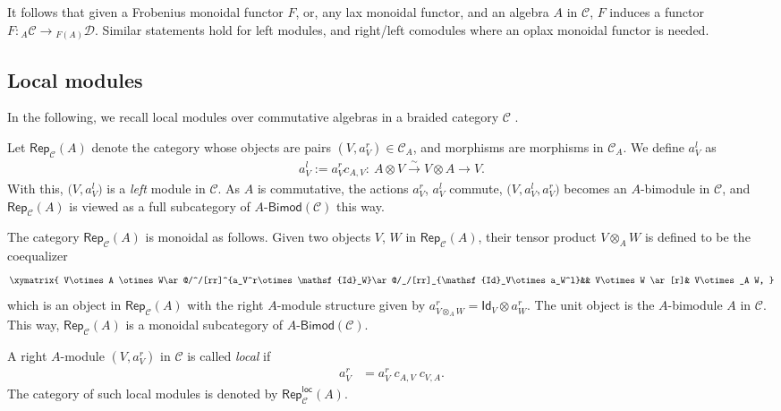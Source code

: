 \documentclass[10pt,a4paper]{amsart}
\numberwithin{equation}{section}
\newcommand{\bimod}[1]{#1\text{-}\mathsf{Bimod}}
\newcommand{\ide}{\mathsf{Id}}
\newcommand{\isomorph}{\stackrel{\sim}{\to}}
\newcommand{\Rep}{\mathsf{Rep}}
\newcommand{\locmod}{\mathsf{Rep}^{\mathsf{loc}}}
\newcommand{\cC}{\mathcal{C}}
\newcommand{\cD}{\mathcal{D}}
\begin{document}
It follows that given a Frobenius monoidal functor $F$, or, any lax monoidal functor, and an algebra $A$ in $\cC$, $F$ induces a functor $F\colon {}_A\cC\to {}_{F(A)}\cD$. Similar statements hold for left modules, and right\slash left comodules where an oplax monoidal functor is needed.

\subsection{Local modules}\label{subsec:local}

In the following, we recall local modules over commutative algebras in a braided category $\cC$ \cite{KO,LW3,Par,Sch}.

\begin{Definition}%
Let $\Rep_{\cC}(A)$ denote the category whose objects are pairs $(V,a_V^r) \in \cC_A$, and morphisms are morphisms in $\cC_A$. We define $a_V^l$ as
\begin{align*}%
a^l_V := a^r_V c_{A,V}\colon\ A\otimes V\isomorph V\otimes A \longrightarrow V.
\end{align*}
With this, $\big(V,a_V^l\big)$ is a \emph{left} module in $\cC$. As $A$ is commutative, the actions $a^r_V$, $a^l_V$ commute, $\big(V,a^l_V,a^r_V\big)$ becomes an $A$-bimodule in $\cC$, and $\Rep_{\cC}(A)$ is viewed as a full subcategory of $\bimod{A}(\cC)$ this way.

The category $\Rep_{\cC}(A)$ is monoidal as follows. Given two objects $V$, $W$ in $\Rep_{\cC}(A)$, their tensor product $V\otimes_A W$ is defined to be the coequalizer
\begin{align}\label{eq:rel-tensor}
\xymatrix{
V\otimes A \otimes W\ar@/^/[rr]^{a_V^r\otimes \ide_W}\ar@/_/[rr]_{\ide_V\otimes a_W^l}&& V\otimes W \ar[r]& V\otimes_A W,
}
\end{align}
which is an object in $\Rep_\cC(A)$ with the right $A$-module structure given by $a_{V\otimes_A W}^r = \ide_V\otimes a^r_W$. The unit object is the $A$-bimodule $A$ in $\cC$. This way, $\Rep_{\cC}(A)$ is a monoidal subcategory of $\bimod{A}(\cC)$.
\end{Definition}

\begin{Definition}%
A right $A$-module $(V,a_V^r)$ in $\cC$ is called \emph{local} if
\begin{align*}
a^r_V&=a^r_V \; c_{A,V} \; c_{V,A}.
\end{align*}
The category of such local modules is denoted by $\locmod_{\cC}(A)$.
\end{Definition}
\end{document}
